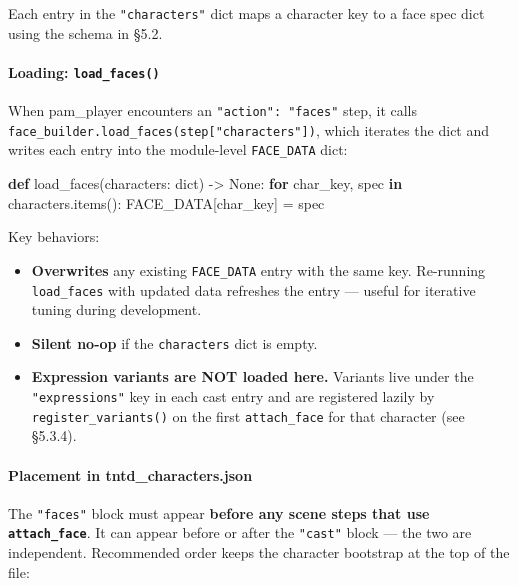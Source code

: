 \documentclass[
  12pt,
  letterpaper,
]{book}
\newenvironment{Shaded}{}{}
\newcommand{\BuiltInTok}[1]{\textcolor[rgb]{0.00,0.50,0.00}{#1}}
\newcommand{\ControlFlowTok}[1]{\textcolor[rgb]{0.00,0.44,0.13}{\textbf{#1}}}
\newcommand{\KeywordTok}[1]{\textcolor[rgb]{0.00,0.44,0.13}{\textbf{#1}}}
\newcommand{\NormalTok}[1]{#1}
\newcommand{\OperatorTok}[1]{\textcolor[rgb]{0.40,0.40,0.40}{#1}}
\newcommand{\VariableTok}[1]{\textcolor[rgb]{0.10,0.09,0.49}{#1}}
\providecommand{\tightlist}{%
  \setlength{\itemsep}{0pt}\setlength{\parskip}{0pt}}
\begin{document}
Each entry in the \texttt{"characters"} dict maps a character key to a
face spec dict using the schema in §5.2.

\paragraph{\texorpdfstring{Loading:
\texttt{load\_faces()}}{Loading: load\_faces()}}\label{loading-load_faces}

When pam\_player encounters an \texttt{"action":\ "faces"} step, it
calls \texttt{face\_builder.load\_faces(step{[}"characters"{]})}, which
iterates the dict and writes each entry into the module-level
\texttt{FACE\_DATA} dict:

\begin{Shaded}
\begin{Highlighting}[]
\KeywordTok{def}\NormalTok{ load\_faces(characters: }\BuiltInTok{dict}\NormalTok{) }\OperatorTok{{-}\textgreater{}} \VariableTok{None}\NormalTok{:}
    \ControlFlowTok{for}\NormalTok{ char\_key, spec }\KeywordTok{in}\NormalTok{ characters.items():}
\NormalTok{        FACE\_DATA[char\_key] }\OperatorTok{=}\NormalTok{ spec}
\end{Highlighting}
\end{Shaded}

Key behaviors:

\begin{itemize}
\tightlist
\item
  \textbf{Overwrites} any existing \texttt{FACE\_DATA} entry with the
  same key. Re-running \texttt{load\_faces} with updated data refreshes
  the entry --- useful for iterative tuning during development.
\item
  \textbf{Silent no-op} if the \texttt{characters} dict is empty.
\item
  \textbf{Expression variants are NOT loaded here.} Variants live under
  the \texttt{"expressions"} key in each cast entry and are registered
  lazily by \texttt{register\_variants()} on the first
  \texttt{attach\_face} for that character (see §5.3.4).
\end{itemize}

\paragraph{Placement in
tntd\_characters.json}\label{placement-in-tntd_characters.json}

The \texttt{"faces"} block must appear \textbf{before any scene steps
that use \texttt{attach\_face}}. It can appear before or after the
\texttt{"cast"} block --- the two are independent. Recommended order
keeps the character bootstrap at the top of the file:
\end{document}
